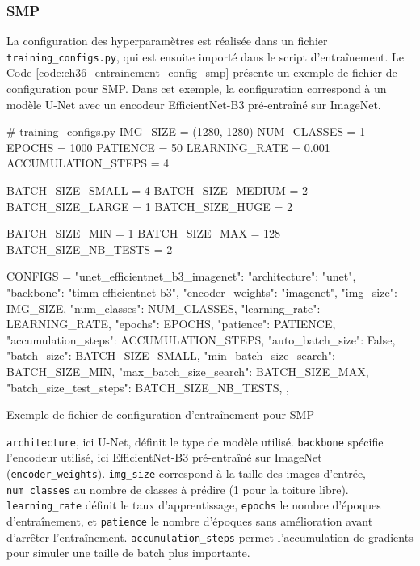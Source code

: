 \subsubsection{SMP}
La configuration des hyperparamètres est réalisée dans un fichier \texttt{training\_configs.py}, qui est ensuite importé dans le script d'entraînement. Le Code \ref{code:ch36_entrainement_config_smp} présente un exemple de fichier de configuration pour SMP. Dans cet exemple, la configuration correspond à un modèle U-Net avec un encodeur EfficientNet-B3 pré-entraîné sur ImageNet.

\begin{code}[H]
    \begin{pythoncode}
    # training_configs.py
    IMG_SIZE = (1280, 1280)
    NUM_CLASSES = 1
    EPOCHS = 1000
    PATIENCE = 50
    LEARNING_RATE = 0.001
    ACCUMULATION_STEPS = 4

    BATCH_SIZE_SMALL = 4
    BATCH_SIZE_MEDIUM = 2
    BATCH_SIZE_LARGE = 1
    BATCH_SIZE_HUGE = 2

    BATCH_SIZE_MIN = 1
    BATCH_SIZE_MAX = 128
    BATCH_SIZE_NB_TESTS = 2

    CONFIGS = {
        "unet_efficientnet_b3_imagenet": {
            "architecture": "unet",
            "backbone": "timm-efficientnet-b3",
            "encoder_weights": "imagenet",
            "img_size": IMG_SIZE,
            "num_classes": NUM_CLASSES,
            "learning_rate": LEARNING_RATE,
            "epochs": EPOCHS,
            "patience": PATIENCE,
            "accumulation_steps": ACCUMULATION_STEPS,
            "auto_batch_size": False,
            "batch_size": BATCH_SIZE_SMALL,
            "min_batch_size_search": BATCH_SIZE_MIN,
            "max_batch_size_search": BATCH_SIZE_MAX,
            "batch_size_test_steps": BATCH_SIZE_NB_TESTS,
        },
    }
    \end{pythoncode}
    \caption{Exemple de fichier de configuration d'entraînement pour SMP}
    \label{code:ch36_entrainement_config_smp}
\end{code}

\texttt{architecture}, ici U-Net, définit le type de modèle utilisé. \texttt{backbone} spécifie l'encodeur utilisé, ici EfficientNet-B3 pré-entraîné sur ImageNet (\texttt{encoder\_weights}). \texttt{img\_size} correspond à la taille des images d'entrée, \texttt{num\_classes} au nombre de classes à prédire (1 pour la toiture libre). \texttt{learning\_rate} définit le taux d'apprentissage, \texttt{epochs} le nombre d'époques d'entraînement, et \texttt{patience} le nombre d'époques sans amélioration avant d'arrêter l'entraînement. \texttt{accumulation\_steps} permet l'accumulation de gradients pour simuler une taille de batch plus importante.

